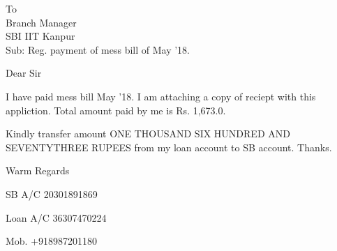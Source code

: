\documentclass{letter}
\begin{document}
\begin{letter}{To \\ Branch Manager \\ SBI IIT Kanpur \\ Sub: Reg. payment of mess bill of May '18.}
\opening{Dear Sir}
I have paid mess bill May '18. I am attaching a copy of reciept with this appliction. Total amount paid by me is Rs. 1,673.0. \par 
Kindly transfer amount ONE THOUSAND SIX HUNDRED AND SEVENTYTHREE RUPEES from my loan account to SB account. Thanks.
\closing{Warm Regards}
SB A/C 20301891869\par 
Loan A/C 36307470224\par 
Mob. +918987201180

\end{letter}
\end{document}
